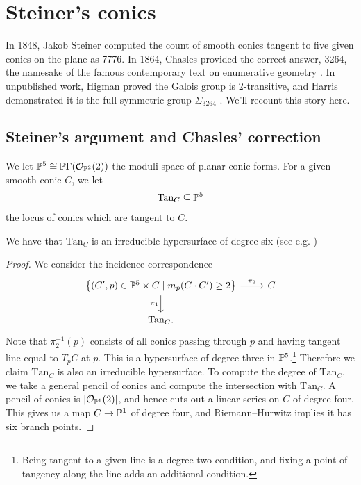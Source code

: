 \documentclass[11pt]{amsart}
\providecommand{\Tan}{\mathrm{Tan}}
\begin{document}
\section{Steiner's conics}

In 1848, Jakob Steiner computed the count of smooth conics tangent to five given conics on the plane as 7776. In 1864, Chasles provided the correct answer, 3264, the namesake of the famous contemporary text on enumerative geometry \cite{3264}. In unpublished work, Higman proved the Galois group is $2$-transitive, and Harris demonstrated it is the full symmetric group $\Sigma_{3264}$ \cite[\S~IV]{Harris-Galois}. We'll recount this story here.

\subsection{Steiner's argument and Chasles' correction}

We let $\P^5 \cong \P\Gamma(\O_{\P^2}(2))$ the moduli space of planar conic forms. For a given smooth conic $C$, we let
\begin{align*}
    \Tan_C \subseteq \P^5
\end{align*}
the locus of conics which are tangent to $C$.

\begin{proposition}\label{prop:tanC-irred-hypersurface-deg6} 
We have that $\Tan_C$ is an irreducible hypersurface of degree six (see e.g. \cite[p.~290]{3264})
\end{proposition}
\begin{proof} We consider the incidence correspondence
\[ \begin{tikzcd}
    {\left\{ (C',p) \in \P^5 \times C \mid m_p(C\cdot C')\ge 2\right\}}\rar["\pi_2"]\dar["\pi_1" left] & C\\
    \Tan_C. & 
\end{tikzcd} \]
Note that $\pi_2^{-1}(p)$ consists of all conics passing through $p$ and having tangent line equal to $T_pC$ at $p$. This is a hypersurface of degree three in $\P^5$.\footnote{Being tangent to a given line is a degree two condition, and fixing a point of tangency along the line adds an additional condition.} Therefore we claim $\Tan_C$ is also an irreducible hypersurface. To compute the degree of $\Tan_C$, we take a general pencil of conics and compute the intersection with $\Tan_C$. A pencil of conics is $|\O_{\P^1}(2)|$, and hence cuts out a linear series on $C$ of degree four. This gives us a map $C \to \P^1$ of degree four, and Riemann--Hurwitz implies it has six branch points.
\end{proof}
\end{document}
